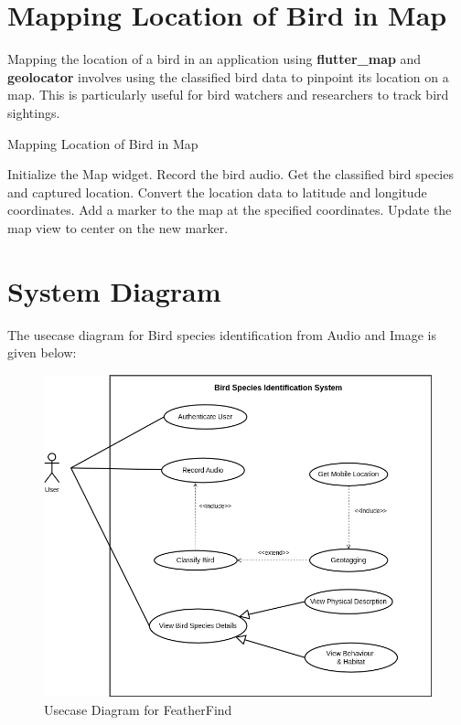 \newpage

\section{Mapping Location of Bird in Map}

Mapping the location of a bird in an application using \textbf{flutter\_map} and
\textbf{geolocator} involves using the classified bird data to pinpoint its
location on a map. This is particularly useful for bird watchers and
researchers to track bird sightings.

\begin{algorithm}
    \caption{Mapping Location of Bird in Map}
    \begin{algorithmic}[1]
        \STATE Initialize the Map widget.
        \STATE Record the bird audio.
        \STATE Get the classified bird species and captured location.
        \STATE Convert the location data to latitude and longitude coordinates.
        \STATE Add a marker to the map at the specified coordinates.
        \STATE Update the map view to center on the new marker.
    \end{algorithmic}
\end{algorithm}
\newpage
\section{System Diagram}
The usecase diagram for Bird species identification from Audio and Image is
given below:
\begin{figure}[h!]
    \centering
    \includegraphics[scale=0.5]{images/usecase.png}
    \caption{Usecase Diagram for
        FeatherFind}%
\end{figure}

